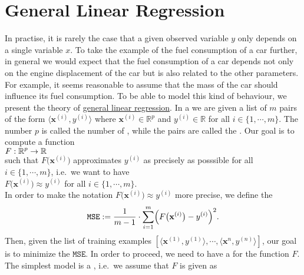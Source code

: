 \section{General Linear Regression}
In practise, it is rarely the case that a given observed variable $y$ only depends on a single variable $x$.
To take the example of the fuel consumption of a car further, in general we would expect that the fuel consumption
of a car depends not only on the engine displacement of the car but is also related to the other parameters.
For example, it seems reasonable to assume that the mass of the car should influence its fuel consumption.
To be able to model this kind of behaviour,  we present the theory of   
\href{https://en.wikipedia.org/wiki/Linear_regression}{general linear regression}.
In a  we are given a list of $m$ pairs of the form $\langle\mathbf{x}^{(i)}, y^{(i)} \rangle$ 
where $\mathbf{x}^{(i)} \in \mathbb{R}^p$ and $y^{(i)} \in \mathbb{R}$ for all $i \in \{1,\cdots,m\}$.  The
number $p$ is called the number of , while the pairs are called the . 
Our goal is to compute a function 
\\[0.2cm]
\hspace*{1.3cm}
$\displaystyle F:\mathbb{R}^p \rightarrow \mathbb{R}$
\\[0.2cm]  
such that $F\bigl(\mathbf{x}^{(i)}\bigr)$ approximates  $y^{(i)}$ as precisely as posssible
for all $i\in\{1,\cdots,m\}$, i.e.~we want to have
\\[0.2cm]
\hspace*{1.3cm}
$F\bigl(\mathbf{x}^{(i)}\bigr) \approx y^{(i)}$ \quad for all $i\in\{1,\cdots,m\}$.
\\[0.2cm]
In order to make the notation $F\bigl(\mathbf{x}^{(i)}\bigr) \approx y^{(i)}$ more precise, we
define the   
\begin{equation}
  \label{eq:squared-error-1}
  \mathtt{MSE} := \frac{1}{m-1} \cdot \sum\limits_{i=1}^{m} \Bigl(F\bigl(\mathbf{x}^{(i)}\bigr) - y^{(i)}\Bigr)^2. 
\end{equation}
Then, given the list of training examples $[\langle \mathbf{x}^{(1)}, y^{(1)} \rangle, \cdots, \langle
\mathbf{x}^{n}, y^{(n)} \rangle]$, our goal is to minimize the $\mathtt{MSE}$.  
In order to proceed, we need to have a  for the function $F$.  The simplest model is a 
,  i.e.~we assume that $F$ is given as 
